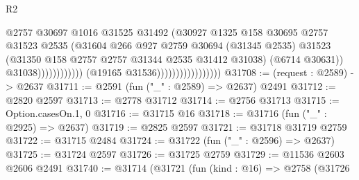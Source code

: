 \begin{lexlean}{R2}
\begin{coremodule}
                                                          @2757
                                                          @30697
                                                          @1016
                                                          @31525
                                                          @31492
                                                          (@30927
                                                            @1325
                                                            @158
                                                            @30695
                                                            @2757
                                                            @31523
                                                            @2535
                                                            (@31604
                                                              @266
                                                              @927
                                                              @2759
                                                              @30694
                                                              (@31345 @2535)
                                                              @31523
                                                              (@31350
                                                                @158
                                                                @2757
                                                                @2757
                                                                @31344
                                                                @2535
                                                                @31412
                                                                @31038)
                                                              (@6714 @30631))
                                                            @31038))))))))))))
                                    (@19165 @31536)))))))))))))))))
@31708 := (request : @2589) -> @2637
@31711 := @2591 (fun ("_" : @2589) => @2637) @2491
@31712 := @2820 @2597
@31713 := @2778 @31712
@31714 := @2756 @31713
@31715 := Option.casesOn.{1, 0}
@31716 := @31715 @16
@31718 := @31716 (fun ("_" : @2925) => @2637)
@31719 := @2825 @2597
@31721 := @31718 @31719 @2759
@31722 := @31715 @2484
@31724 := @31722 (fun ("_" : @2596) => @2637)
@31725 := @31724 @2597
@31726 := @31725 @2759
@31729 := @11536 @2603 @2606 @2491
@31740 := @31714
    (@31721
      (fun (kind : @16) =>
      @2758
        (@31726

\end{coremodule}
\end{lexlean}
